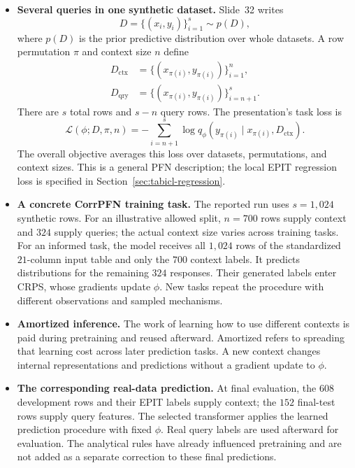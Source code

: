 \documentclass[11pt]{article}
\newenvironment{notes}
  {\begin{itemize}\setlength{\itemsep}{0.45em}\setlength{\parsep}{0pt}}
  {\end{itemize}}
\begin{document}
\begin{notes}
    \item \textbf{Several queries in one synthetic dataset.}
    Slide~32 writes
    \[
        D=\{(x_i,y_i)\}_{i=1}^{s}\sim p(D),
    \]
    where \(p(D)\) is the prior predictive distribution over
    whole datasets. A row permutation \(\pi\) and context size
    \(n\) define
    \[
    \begin{aligned}
        D_{\mathrm{ctx}}
        &=\{(x_{\pi(i)},y_{\pi(i)})\}_{i=1}^{n},\\
        D_{\mathrm{qry}}
        &=\{(x_{\pi(i)},y_{\pi(i)})\}_{i=n+1}^{s}.
    \end{aligned}
    \]
    There are \(s\) total rows and \(s-n\) query rows.
    The presentation's task loss is
    \[
        \mathcal{L}(\phi;D,\pi,n)
        =
        -\sum_{i=n+1}^{s}
        \log q_\phi
        \left(y_{\pi(i)}\mid x_{\pi(i)},D_{\mathrm{ctx}}\right).
    \]
    The overall objective averages this loss over datasets,
    permutations, and context sizes. This is a general PFN
    description; the local EPIT regression loss is specified in
    Section~\ref{sec:tabicl-regression}.

    \item \textbf{A concrete CorrPFN training task.}
    The reported run uses \(s=1{,}024\) synthetic rows.
    For an illustrative allowed split, \(n=700\) rows supply
    context and \(324\) supply queries; the actual context size
    varies across training tasks. For an informed task, the model
    receives all \(1{,}024\) rows of the standardized
    \(21\)-column input table and only the \(700\) context labels.
    It predicts distributions for the remaining \(324\) responses.
    Their generated labels enter CRPS, whose gradients update
    \(\phi\). New tasks repeat the procedure with different
    observations and sampled mechanisms.

    \item \textbf{Amortized inference.} The work of learning how to
    use different contexts is paid during pretraining and reused
    afterward. Amortized refers to spreading that learning
    cost across later prediction tasks. A new context changes
    internal representations and predictions without a gradient
    update to \(\phi\).

    \item \textbf{The corresponding real-data prediction.}
    At final evaluation, the \(608\) development rows and their
    EPIT labels supply context; the \(152\) final-test rows supply
    query features. The selected transformer applies the learned
    prediction procedure with fixed \(\phi\). Real query labels
    are used afterward for evaluation. The analytical rules have
    already influenced pretraining and are not added as a separate
    correction to these final predictions.


\end{notes}
\end{document}
